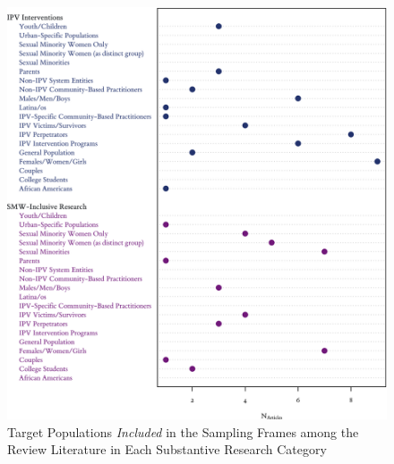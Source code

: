 \documentclass[11pt,]{tufte-book}
\begin{document}
\newpage

\begin{figure}
\centering
\includegraphics{graphics/inputs/populations.png}
\caption{Target Populations \emph{Included} in the Sampling Frames among
the Review Literature in Each Substantive Research
Category\label{fig:populations}}
\end{figure}

\newpage
\end{document}
